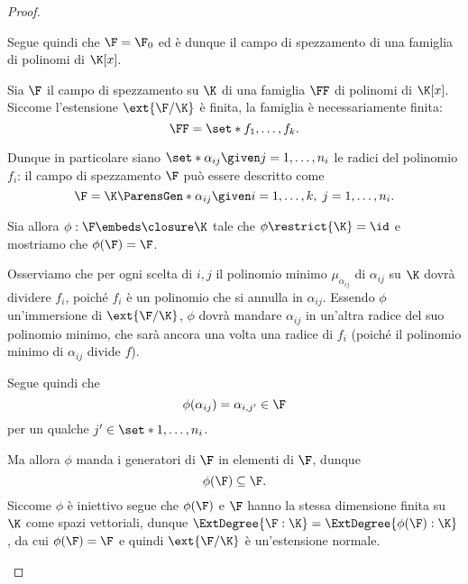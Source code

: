 \begin{proof}
\begin{description}
        Segue quindi che $\F = \F_0$ ed è dunque il campo di spezzamento di una famiglia di polinomi di $\K[x]$. 
        \item[\fcolorbox{Black}{White}{(3) $\implies$ (1)}]
        Sia $\F$ il campo di spezzamento su $\K$ di una famiglia $\FF$ di polinomi di $\K[x]$. Siccome l'estensione $\ext{\F / \K}$ è finita, la famiglia è necessariamente finita: \[
            \FF = \set*{f_1, \dots, f_k}.
        \]

        Dunque in particolare siano $\set*{\alpha_{ij} \given j = 1, \dots, n_i}$ le radici del polinomio $f_i$: il campo di spezzamento $\F$ può essere descritto come \[
            \F = \K\ParensGen*{\alpha_{ij} \given i = 1, \dots, k,\; j = 1, \dots, n_i}.
        \]

        Sia allora $\phi : \F \embeds \closure\K$ tale che $\phi\restrict{\K} = \id$ e mostriamo che $\phi(\F) = \F$. 
        
        Osserviamo che per ogni scelta di $i, j$ il polinomio minimo $\mu_{\alpha_{ij}}$ di $\alpha_{ij}$ su $\K$ dovrà dividere $f_i$, poiché $f_i$ è un polinomio che si annulla in $\alpha_{ij}$. Essendo $\phi$ un'immersione di $\ext{\F / \K}$, $\phi$ dovrà mandare $\alpha_{ij}$ in un'altra radice del suo polinomio minimo, che sarà ancora una volta una radice di $f_i$ (poiché il polinomio minimo di $\alpha_{ij}$ divide $f$).
        
        Segue quindi che \[
            \phi(\alpha_{ij}) = \alpha_{i,j'} \in \F
        \] per un qualche $j' \in \set*{1, \dots, n_i}$.
        
        Ma allora $\phi$ manda i generatori di $\F$ in elementi di $\F$, dunque \[
            \phi(\F) \subseteq \F.
        \] Siccome $\phi$ è iniettivo segue che $\phi(\F)$ e $\F$ hanno la stessa dimensione finita su $\K$ come spazi vettoriali, dunque $\ExtDegree{\F : \K} = \ExtDegree{\phi(\F) : \K}$, da cui $\phi(\F) = \F$ e quindi $\ext{\F / \K}$ è un'estensione normale.   \qedhere
    \end{description}
\end{proof}

